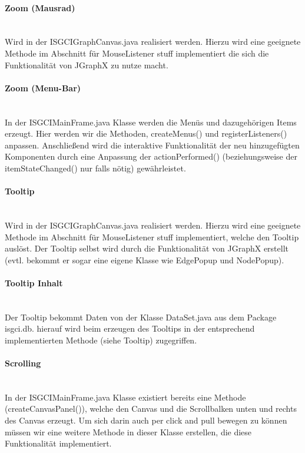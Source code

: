 \documentclass[10pt,a4paper]{article}
\begin{document}
\paragraph{Zoom (Mausrad)}\ \\ 

Wird in der ISGCIGraphCanvas.java realisiert werden. Hierzu wird eine geeignete Methode im Abschnitt für MouseListener stuff implementiert die sich die Funktionalität von JGraphX zu nutze macht.

\paragraph{Zoom (Menu-Bar)}\ \\ 

In der ISGCIMainFrame.java Klasse werden die Menüs und dazugehörigen Items erzeugt. Hier werden wir die Methoden, createMenus() und registerListeners() anpassen. Anschließend wird die interaktive Funktionalität der neu hinzugefügten Komponenten durch eine Anpassung der actionPerformed() (beziehungsweise der itemStateChanged() nur falls nötig) gewährleistet.

\paragraph{Tooltip}\ \\ 

Wird in der ISGCIGraphCanvas.java realisiert werden. Hierzu wird eine geeignete Methode im Abschnitt für MouseListener stuff implementiert, welche den Tooltip auslöst. Der Tooltip selbst wird durch die Funktionalität von JGraphX erstellt (evtl. bekommt er sogar eine eigene Klasse wie EdgePopup und NodePopup).

\paragraph{Tooltip Inhalt}\ \\ 

 Der Tooltip bekommt Daten von der Klasse DataSet.java aus dem Package isgci.db. hierauf wird beim erzeugen des Tooltips in der entsprechend implementierten Methode (siehe Tooltip) zugegriffen.


\paragraph{Scrolling}\ \\ 

In der ISGCIMainFrame.java Klasse existiert bereits eine Methode (createCanvasPanel()), welche den Canvas und die Scrollbalken unten und rechts des Canvas erzeugt. Um sich darin auch per click and pull bewegen zu können müssen wir eine weitere Methode in dieser Klasse erstellen, die diese Funktionalität implementiert.
\end{document}
